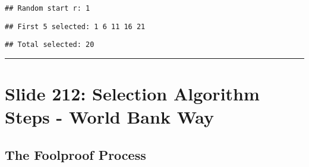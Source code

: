 \documentclass[
]{article}
\newenvironment{Shaded}{\begin{snugshade}}{\end{snugshade}}
\newcommand{\DecValTok}[1]{\textcolor[rgb]{0.00,0.00,0.81}{#1}}
\newcommand{\FunctionTok}[1]{\textcolor[rgb]{0.13,0.29,0.53}{\textbf{#1}}}
\newcommand{\NormalTok}[1]{#1}
\newcommand{\SpecialCharTok}[1]{\textcolor[rgb]{0.81,0.36,0.00}{\textbf{#1}}}
\newcommand{\StringTok}[1]{\textcolor[rgb]{0.31,0.60,0.02}{#1}}
\begin{document}
\begin{verbatim}
## Random start r: 1
\end{verbatim}

\begin{Shaded}
\end{Shaded}

\begin{verbatim}
## First 5 selected: 1 6 11 16 21
\end{verbatim}

\begin{Shaded}
\end{Shaded}

\begin{verbatim}
## Total selected: 20
\end{verbatim}

\begin{center}\rule{0.5\linewidth}{0.5pt}\end{center}

\section{Slide 212: Selection Algorithm Steps - World Bank
Way}\label{slide-212-selection-algorithm-steps---world-bank-way}

\subsection{The Foolproof Process}\label{the-foolproof-process}
\end{document}
